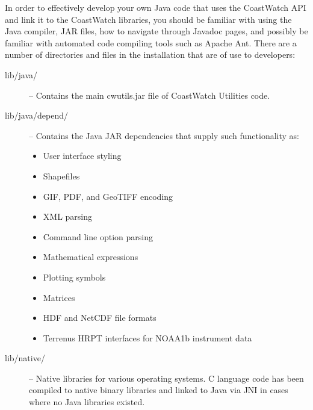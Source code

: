 In order to effectively develop your own Java code that uses the
CoastWatch API and link it to the CoastWatch libraries, you
should be familiar with using the Java compiler, JAR files, how
to navigate through Javadoc pages, and possibly be familiar with
automated code compiling tools such as Apache Ant.  There are a number
of directories and files in the installation that are of use to
developers:
\begin{description}

\item[{\file lib/java/}] -- Contains the main {\file cwutils.jar} file of
CoastWatch Utilities code.

\item[{\file lib/java/depend/}] -- Contains the Java JAR dependencies that 
supply such functionality as:
\begin{itemize}

\item User interface styling  
\item Shapefiles
\item GIF, PDF, and GeoTIFF encoding
\item XML parsing
\item Command line option parsing
\item Mathematical expressions
\item Plotting symbols
\item Matrices
\item HDF and NetCDF file formats
\item Terrenus HRPT interfaces for NOAA1b instrument data

\end{itemize}

\item[{\file lib/native/}] -- Native libraries for various operating systems.
C language code has been compiled to native binary libraries and
linked to Java via JNI in cases where no Java libraries existed.

\end{description}

